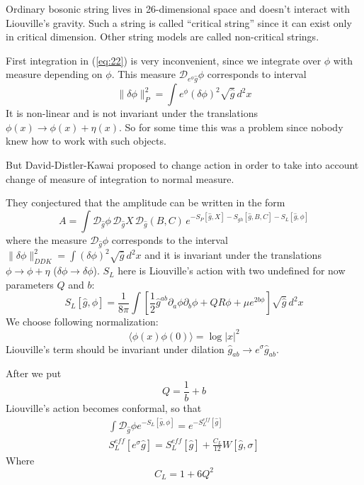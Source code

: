 \documentclass[a4paper,12pt]{article}
\theoremstyle{definition} \newtheorem{Def}{Definition}
\begin{document}
Ordinary bosonic string lives in 26-dimensional space and doesn't interact with Liouville's gravity. Such a string is called ``critical string'' since it can exist only in critical dimension. Other string models are called non-critical strings.

First integration in (\ref{eq:22}) is very inconvenient, since we integrate over $\phi$ with measure depending on $\phi$. This measure $\mathcal{D}_{e^{\phi}\hat{g}}\phi$ corresponds to interval
\begin{equation}
  \label{eq:23}
  \|\delta\phi\|^2_P = \int e^{\phi} (\delta\phi)^2 \sqrt{\hat{g}}\, d^2 x
\end{equation}
It is non-linear and is not invariant under the translations $\phi(x)\to \phi(x)+\eta(x)$.
So for some time this was a problem since nobody knew how to work with such objects.

But David-Distler-Kawai proposed to change action in order to take into account change of measure of integration to normal measure.

They conjectured that the amplitude can be written in the form
\begin{equation}
  \label{eq:24}
  A=\int \mathcal{D}_{\hat{g}}\phi\, \mathcal{D}_{\hat{g}} X\, \mathcal{D}_{\hat{g}} (B,C)\, e^{-S_P[\hat{g},X]-S_{gh}[\hat{g},B,C]-S_L[\hat{g},\phi]}
\end{equation}
where the measure $\mathcal{D}_{\hat{g}} \phi$ corresponds to the interval $\|\delta\phi\|^2_{DDK} = \int (\delta\phi)^2 \sqrt{\hat{g}}\, d^2x$ and it is invariant under the translations $\phi\to \phi+\eta$ ($\delta\phi\to \delta\phi$). 
$S_L$ here is Liouville's action with two undefined for now parameters $Q$ and $b$:
\begin{equation}
  \label{eq:25}
  S_L[\hat{g},\phi] = \frac{1}{8\pi} \int \left[ \frac{1}{2} \hat{g}^{ab} \partial_a \phi \partial_b \phi + QR\phi +\mu e^{2b\phi}\right] \sqrt{\hat{g}} \, d^2x
\end{equation}
We choose following normalization:
\begin{equation}
  \label{eq:26}
  \langle \phi(x) \phi(0) \rangle = \log |x|^2
\end{equation}
Liouville's term should be invariant under dilation $\hat{g}_{ab}\to e^{\sigma}\hat{g}_{ab}$.

After we put
\begin{equation}
  \label{eq:27}
  Q=\frac{1}{b}+b
\end{equation}
Liouville's action becomes conformal, so that
\begin{equation}
  \label{eq:28}
  \begin{split}
    \int \mathcal{D}_{\hat{g}} \phi e^{-S_L[\hat g,\phi]} = e^{-S_L^{eff}[\hat g]}\\
    S_L^{eff} [e^{\sigma}\hat{g}]=S_L^{eff}[\hat g] +\frac{C_L}{12} W[\hat g,\sigma]
  \end{split}
\end{equation}
Where
\begin{equation}
  \label{eq:29}
  C_L=1+6 Q^2
\end{equation}
\end{document}
